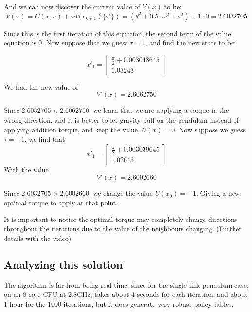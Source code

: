 \documentclass{article}
\begin{document}
And we can now discover the current value of $V(x)$ to be:
\begin{equation} 
V(x) = C(x,u) + \omega V(x_{k+1}(\{\tau'\})=(\theta^2+0.5 \cdot \omega^2 + \tau^2)+1 \cdot 0 = 2.6032705
\end{equation}

Since this is the first iteration of this equation, the second term of the value equation is 0. Now suppose that we guess $\tau=1$, and find the new state to be:


\begin{equation} 
{x'}_1 = 
\begin{bmatrix}
\frac{\pi}{2} + 0.003048645 \\
1.03243
\end{bmatrix}
\end{equation}

We find the new value of
\begin{equation} 
V'(x) = 2.6062750
\end{equation}

Since $2.6032705 < 2.6062750$, we learn that we are applying a torque in the wrong direction, and it is better to let gravity pull on the pendulum instead of applying addition torque, and keep the value, $U(x)={0}$. Now suppose we guess $\tau = -1$, we find that 
\begin{equation} 
{x'}_1 = 
\begin{bmatrix}
\frac{\pi}{2} + 0.003039645 \\
1.02643
\end{bmatrix}
\end{equation}
With the value
\begin{equation} 
V'(x) = 2.6002660
\end{equation}

Since $2.6032705 > 2.6002660$, we change the value $U(x_0)={-1}$. Giving a new optimal torque to apply at that point.

It is important to notice the optimal torque may completely change directions throughout the iterations due to the value of the neighbours changing. (Further details with the video)

\subsection{Analyzing this solution}
The algorithm is far from being real time, since for the single-link pendulum case, on an 8-core CPU at 2.8GHz, takes about 4 seconds for each iteration, and about 1 hour for the 1000 iterations, but it does generate very robust policy tables.
\end{document}
